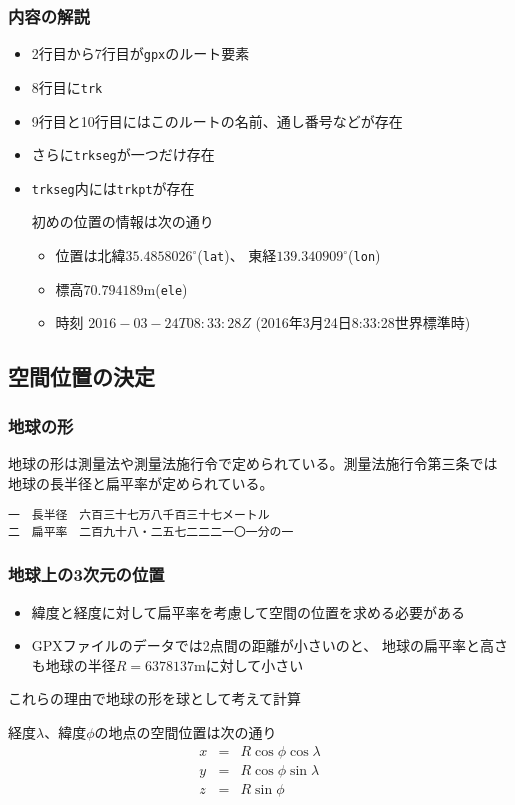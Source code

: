 \begin{frame}[containsverbatim]
 \frametitle{内容の解説}
 \begin{itemize}
  \item 2行目から7行目が\texttt{gpx}のルート要素
  \item 8行目に\texttt{trk}
  \item 9行目と10行目にはこのルートの名前、通し番号などが存在
  \item さらに\texttt{trkseg}が一つだけ存在
  \item \texttt{trkseg}内には\texttt{trkpt}が存在

        初めの位置の情報は次の通り
        \begin{itemize}
         \item 位置は北緯$35.4858026^{\circ}$(\texttt{lat})、
               東経$139.340909^{\circ}$(\texttt{lon})
         \item 標高$70.794189\mathrm{m}$(\texttt{ele})
         \item 時刻 $2016-03-24T08:33:28Z$
               (2016年3月24日8:33:28世界標準時)
        \end{itemize}
 \end{itemize}
\end{frame}
\subsection{空間位置の決定}
\begin{frame}[containsverbatim]
 \frametitle{地球の形}
地球の形は測量法や測量法施行令で定められている。測量法施行令第三条では
地球の長半径と扁平率が定められている。
\begin{Verbatim}
一　長半径　六百三十七万八千百三十七メートル
二　扁平率　二百九十八・二五七二二二一〇一分の一
\end{Verbatim}
\end{frame}
\begin{frame}[containsverbatim]
 \frametitle{地球上の3次元の位置}
 \begin{itemize}
  \item 緯度と経度に対して扁平率を考慮して空間の位置を求める必要がある
  \item GPXファイルのデータでは2点間の距離が小さいのと、
地球の扁平率と高さも地球の半径$R=6378137\mathrm{m}$に対して小さい
 \end{itemize}
これらの理由で地球の形を球として考えて計算

  経度$\lambda$、緯度$\phi$の地点の空間位置は次の通り
				\begin{eqnarray*}
				 x &=& R\cos\phi\cos\lambda\\
				 y &=& R\cos\phi\sin\lambda\\
				 z &=& R\sin\phi
				\end{eqnarray*}
\end{frame}
